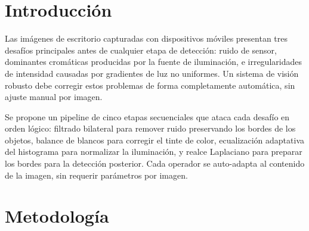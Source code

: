 \documentclass[11pt,a4paper]{article}
\begin{document}
\begin{abstract}
\noindent
Este informe presenta un algoritmo completamente automático para el preprocesamiento
de imágenes de escritorio con objetos de uso diario (lápices, bolígrafos, marcadores,
cuadernos, calculadoras). El pipeline combina filtrado bilateral preservador de bordes
en el espacio Lab para eliminar ruido, balance de blancos \emph{gray-world} para
corregir dominantes cromáticas de la iluminación, ecualización adaptativa del histograma
con restricción de contraste (CLAHE) aplicada sobre el canal de luminancia del espacio
CIE Lab para normalizar la intensidad sin alterar la cromaticidad, y realce de bordes
mediante el filtro Laplaciano para preparar la imagen para la detección posterior.
Todos los pasos usan parámetros universales que no requieren ajuste manual por imagen.
Se evalúa el pipeline sobre imágenes tomadas bajo condiciones de iluminación
heterogéneas, reportando PSNR y SSIM como medida del grado de modificación aplicado.
\end{abstract}

\section{Introducción}
\label{sec:intro}

Las imágenes de escritorio capturadas con dispositivos móviles presentan tres
desafíos principales antes de cualquier etapa de detección: ruido de sensor,
dominantes cromáticas producidas por la fuente de iluminación, e irregularidades
de intensidad causadas por gradientes de luz no uniformes. Un sistema de visión
robusto debe corregir estos problemas de forma completamente automática, sin
ajuste manual por imagen.

Se propone un pipeline de cinco etapas secuenciales que ataca cada desafío en
orden lógico: filtrado bilateral para remover ruido preservando los bordes de
los objetos, balance de blancos para corregir el tinte de color, ecualización
adaptativa del histograma para normalizar la iluminación, y realce Laplaciano
para preparar los bordes para la detección posterior. Cada operador se
auto-adapta al contenido de la imagen, sin requerir parámetros por imagen.

\section{Metodología}
\label{sec:pipeline}
\end{document}
